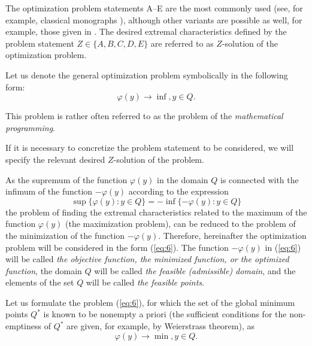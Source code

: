The optimization problem statements A–E are the most commonly used (see, for example, classical monographs \cite{1_FloudasPardalos, 1_Himmelblau, 1_HorstPardalos, 1_HorstTuy, 1_McCormick, 1_Mockus, 1_Pinter,  1_SergKvasMonogr, 1_StrSergMon2000, 1_ZhigZhil}), although other variants are possible as well, for example, those given in \cite{1_Himmelblau}. The desired extremal characteristics defined by the problem statement $Z\in\{A, B, C, D, E\}$ are referred to as $Z$-solution of the optimization problem.

Let us denote the general optimization problem symbolically in the following form:
\begin{equation}
\label{eq:6}
\varphi(y)\rightarrow\inf, y \in Q.
\end{equation}

This problem is rather often referred to as the problem of the \textit{mathematical programming}.

If it is necessary to concretize the problem statement to be considered, we will specify the relevant desired $Z$-solution of the problem.

As  the supremum of the function $\varphi(y)$ in the domain $Q$ is connected with the infimum of the function $-\varphi(y)$ according to  the expression
\begin{displaymath}
\sup\{\varphi(y):y \in Q\} = -\inf\{-\varphi(y):y \in Q\}
\end{displaymath}
the problem of finding the extremal characteristics related to the maximum of the function $\varphi(y)$ (the maximization problem), can be reduced to the problem of the minimization of the function $-\varphi(y)$. Therefore, hereinafter the optimization problem will be considered in the form (\ref{eq:6}). The function $-\varphi(y)$ in (\ref{eq:6}) will be called \textit{the objective function, the minimized function, or the optimized function},  the domain $Q$ will be called \textit{the feasible (admissible) domain}, and the elements of the set $Q$ will be called \textit{the feasible points}.

Let us formulate the problem (\ref{eq:6}), for which the set of the global minimum points $Q^*$ is known to be nonempty a priori (the sufficient conditions for the non-emptiness of $Q^*$ are given, for example, by Weierstrass theorem), as
\begin{equation}
\label{eq:7}
\varphi(y)\rightarrow\min, y \in Q.
\end{equation}

